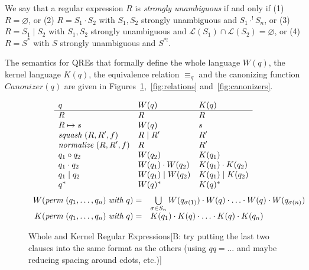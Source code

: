 \documentclass{svproc}
\newcommand{\FINISH}[3]{\ifdraft\textcolor{#1}{[#2: #3]}\fi}
\newcommand{\bcp}[1]{\FINISH{dkred}{B}{#1}}
\newcommand{\squash}[3]{\ensuremath{\mathit{squash} \; (#1, #2, #3)}}
\newcommand{\perm}[2]{\ensuremath{\mathit{perm}\; (#1)\; \mathit{with}\; #2}}
\newcommand{\normalize}[3]{\ensuremath{\mathit{normalize} \; (#1, #2, #3)}}
\newcommand{\sep}{\ensuremath{\; | \;}}
\newcommand{\canonizer}{\ensuremath{\mathit{Canonizer}}}
\newcommand{\eqrel}[1]{\ensuremath{\equiv_{#1}}}
\begin{document}
We say that a regular expression $R$ is \textit{strongly unambiguous} if and
only if (1) $R = \varnothing$, or (2) $R = S_1 \cdot S_2$ with $S_1, S_2$
strongly unambiguous and $S_1 \cdot^! S_n$, or (3) $R = S_1 \sep S_2$ with
$S_1, S_2$ strongly unambiguous and $\mathcal{L}(S_1) \cap \mathcal{L}(S_2) =
\varnothing$, or (4) $R = S^*$ with $S$ strongly unambiguous and $S^{*!}$.

The semantics for QREs that formally define the whole language $W(q)$, the
kernel language $K(q)$, the equivalence relation $\eqrel{q}$ and the
canonizing function $\canonizer(q)$ are given in
Figures~\ref{fig:wk},~\ref{fig:relations} and~\ref{fig:canonizers}.
\begin{figure}[t]
  \centering
  \[
    \begin{array}{l@{\quad}l@{\quad}l}
   
      q & W(q) & K(q) \\ \hline
      R & R & R \\
      R \mapsto s & W(q) & s \\
      \squash{R}{R'}{f} & R \sep R' & R' \\
      \normalize{R}{R'}{f} & R & R' \\
      q_1 \circ  q_2 & W(q_2) & K(q_1) \\
      q_1 \cdot q_2 & W(q_1) \cdot W(q_2) & K(q_1) \cdot K(q_2) \\
      q_1 \sep q_2 & W(q_1) \sep W(q_2) & K(q_1) \sep K(q_2) \\
      q^* & W(q)^* & K(q)^* \\
    \end{array}
  \]
\[
\begin{array}{r@{\quad}l}
W( \perm{q_1, \ldots, q_n}{q} ) = &
\bigcup \limits_{\sigma \in S_n} W(q_{\sigma(1)}) \cdot W(q) \cdot \ldots \cdot
W(q) \cdot W(q_{\sigma(n)})
\\
K( \perm{q_1, \ldots, q_n}{q} ) = &
 K(q_1) \cdot K(q) \cdot \ldots \cdot K(q) \cdot K(q_n) 
\end{array}
\]
  \caption{Whole and Kernel Regular Expressions\bcp{try putting the 
      last two clauses into the same format as the
      others (using $\mathit{qq} = ...$ and maybe reducing spacing around
      cdots, etc.)}}
  \label{fig:wk}
\end{figure}
\end{document}
